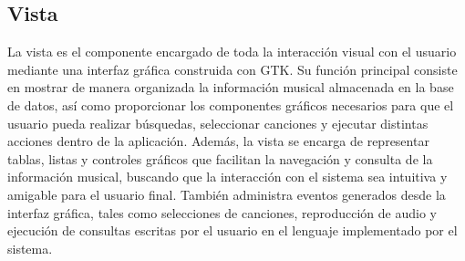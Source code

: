 \documentclass[12pt]{article}
\begin{document}
\subsection{Vista}
La vista es el componente encargado de toda la interacción visual con el usuario mediante una interfaz gráfica construida con GTK. Su función principal consiste en mostrar de manera organizada la información musical almacenada en la base de datos, así como proporcionar los componentes gráficos necesarios para que el usuario pueda realizar búsquedas, seleccionar canciones y ejecutar distintas acciones dentro de la aplicación.
Además, la vista se encarga de representar tablas, listas y controles gráficos que facilitan la navegación y consulta de la información musical, buscando que la interacción con el sistema sea intuitiva y amigable para el usuario final. También administra eventos generados desde la interfaz gráfica, tales como selecciones de canciones, reproducción de audio y ejecución de consultas escritas por el usuario en el lenguaje implementado por el sistema.
\end{document}
